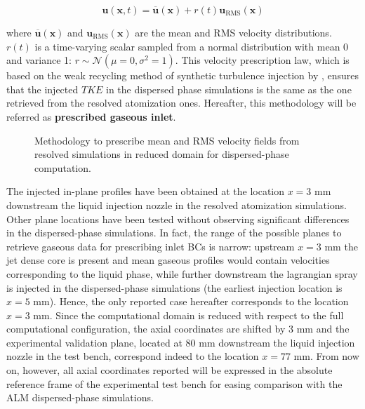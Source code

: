 \begin{equation}
\label{eq:prescribed_inlet_u_gas_injection_law}
\textbf{u} \left( \textbf{x}, t \right) = \overline{\textbf{u}} \left( \textbf{x} \right)  + r \left( t \right)  \textbf{u}_\mathrm{RMS} \left( \textbf{x} \right) 
\end{equation}

where $\overline{\textbf{u}} \left( \textbf{x} \right)$ and $\textbf{u}_\mathrm{RMS} \left( \textbf{x} \right)$ are the mean and RMS velocity distributions. $r \left( t \right)$ is a time-varying scalar sampled from a normal distribution with mean 0 and variance 1: $r \sim \mathcal{N} \left( \mu = 0, \sigma^2 = 1 \right)$. This velocity prescription law, which is based on the weak recycling method of synthetic turbulence injection by \citeColor[wu_large_1995], ensures that the injected $TKE$ in the dispersed phase simulations is the same as the one retrieved from the resolved atomization ones. Hereafter, this methodology will be referred as \textbf{prescribed gaseous inlet}.


\clearpage

\begin{figure}[h!]	
	\centering	{}
	\caption{Methodology to prescribe mean and RMS velocity fields from resolved simulations in reduced domain for dispersed-phase computation.}
	\label{fig:custom_inlet_methodology}
\end{figure}



The injected in-plane profiles have been obtained at the location $x = 3$ mm downstream the liquid injection nozzle in the resolved atomization simulations. Other plane locations have been tested without observing significant differences in the dispersed-phase simulations. In fact, the range of the possible planes to retrieve gaseous data for prescribing inlet BCs is narrow: upstream $x = 3$ mm the jet dense core is present and mean gaseous profiles would contain velocities corresponding to the liquid phase, while further downstream the lagrangian spray is injected in the dispersed-phase simulations (the earliest injection location is $x = 5$ mm). Hence, the only reported case hereafter corresponds to the location $x = 3$ mm. Since the computational domain is reduced with respect to the full computational configuration, the axial coordinates are shifted by 3 mm and the experimental validation plane, located at 80 mm downstream the liquid injection nozzle in the test bench, correspond indeed to the location $x = 77$ mm. From now on, however, all axial coordinates reported will be expressed in the absolute reference frame of the experimental test bench for easing comparison with the ALM dispersed-phase simulations. 

